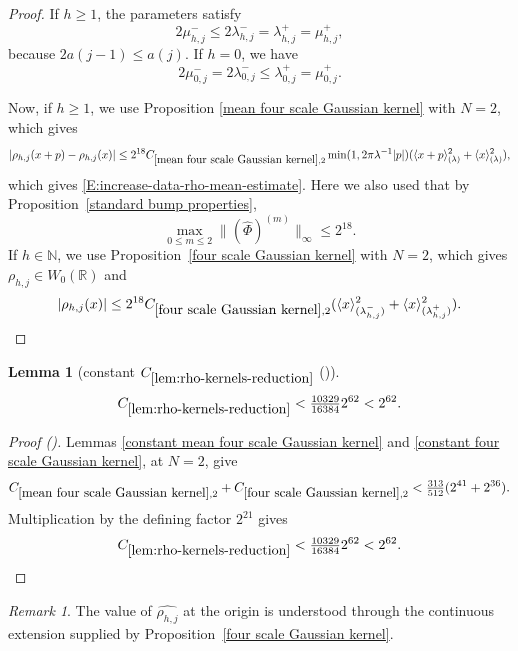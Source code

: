 \documentclass[12pt,reqno]{amsart}
\newcommand{\auto}{{({\tiny\faCar})}}
\theoremstyle{plain}
\newtheorem{lemma}[theorem]{Lemma}
\numberwithin{equation}{section}
\theoremstyle{remark}
\newtheorem{rem}{Remark}[section]
\newcommand{\using}[1]{}
\newcommand{\R}{{\mathbb R}}
\newcommand{\N}{{\mathbb N}}
\begin{document}
\begin{proof}
If \(h\geq1\), the parameters satisfy
\[
2\mu_{h,j}^-
\leq
2\lambda_{h,j}^-
=
\lambda_{h,j}^+
=
\mu_{h,j}^+,
\]
because \(2a(j-1)\leq a(j)\).
If $h=0$, we have
\[
2\mu_{0,j}^-
=
2\lambda_{0,j}^-
\leq
\lambda_{0,j}^+
=
\mu_{0,j}^+.
\]


Now, if $h\ge 1$, we  use Proposition
\ref{mean four scale Gaussian kernel}   with $N=2$, which  gives
\[|\rho_{h,j}(x+p)-\rho_{h,j}(x)| \le 2^{18} C_{\ref{mean four scale Gaussian kernel},2} \min(1,2\pi \lambda^{-1}|p|) (\langle x+p\rangle^2_{(\lambda)}+
\langle x\rangle^2_{(\lambda)}),
\]
which gives \eqref{E:increase-data-rho-mean-estimate}.
Here we also used that by Proposition~\ref{standard bump properties},
\[
\max_{0\leq m\leq2}
\|(\widehat\Phi)^{(m)}\|_\infty
\leq2^{18}.
\]
If $h\in \N$, we use  Proposition~\ref{four scale Gaussian kernel}   with $N=2$, which   gives $\rho_{h,j}\in W_0(\R)$ and
\[ |\rho_{h,j}(x)| \le 2^{18}C_{\ref{four scale Gaussian kernel},2} (\langle x\rangle^2_{(\lambda_{h,j}^-)} + \langle x\rangle^2_{(\lambda_{h,j}^+)}). \]
\end{proof}

\begin{lemma}[constant $C_{\ref{lem:rho-kernels-reduction}}$ \auto]\label{constant rho kernels reduction}\using{lem:rho-kernels-reduction}\using{constant mean four scale Gaussian kernel}\using{constant four scale Gaussian kernel}\using{mean four scale Gaussian kernel}\using{four scale Gaussian kernel}
\begin{equation}\label{constant rho kernels reduction bound}
C_{\ref{lem:rho-kernels-reduction}}
<\tfrac{10329}{16384}2^{62}<2^{62}.
\end{equation}
\end{lemma}
\begin{proof}[Proof \auto]
Lemmas \ref{constant mean four scale Gaussian kernel} and \ref{constant four scale Gaussian kernel}, at $N=2$, give
\[
C_{\ref{mean four scale Gaussian kernel},2}
+C_{\ref{four scale Gaussian kernel},2}
<\tfrac{313}{512}(2^{41}+2^{36}).
\]
Multiplication by the defining factor $2^{21}$ gives
\[
C_{\ref{lem:rho-kernels-reduction}}
<\tfrac{10329}{16384}2^{62}<2^{62}.
\]
\end{proof}


\begin{rem}
The value of $\widehat{\rho_{h,j}}$   at the origin is understood through the continuous
extension supplied by Proposition~\ref{four scale Gaussian kernel}.
\end{rem}
\end{document}

